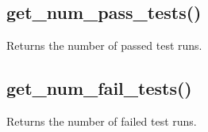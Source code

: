 \documentclass[letterpaper,10pt,english]{sphinxmanual}
\begin{document}
\sphinxAtStartPar
{}

\begin{sphinxVerbatim}[commandchars=\\\{\}]
  
\end{sphinxVerbatim}


\subsection{get\_num\_pass\_tests()}
\label{\detokenize{api:get-num-pass-tests}}
\sphinxAtStartPar
Returns the number of passed test runs.

\begin{sphinxVerbatim}[commandchars=\\\{\}]
\end{sphinxVerbatim}

\sphinxAtStartPar
{}

\begin{sphinxVerbatim}[commandchars=\\\{\}]
  
\end{sphinxVerbatim}


\subsection{get\_num\_fail\_tests()}
\label{\detokenize{api:get-num-fail-tests}}
\sphinxAtStartPar
Returns the number of failed test runs.

\begin{sphinxVerbatim}[commandchars=\\\{\}]
\end{sphinxVerbatim}

\sphinxAtStartPar
{}

\begin{sphinxVerbatim}[commandchars=\\\{\}]
  
\end{sphinxVerbatim}
\end{document}
